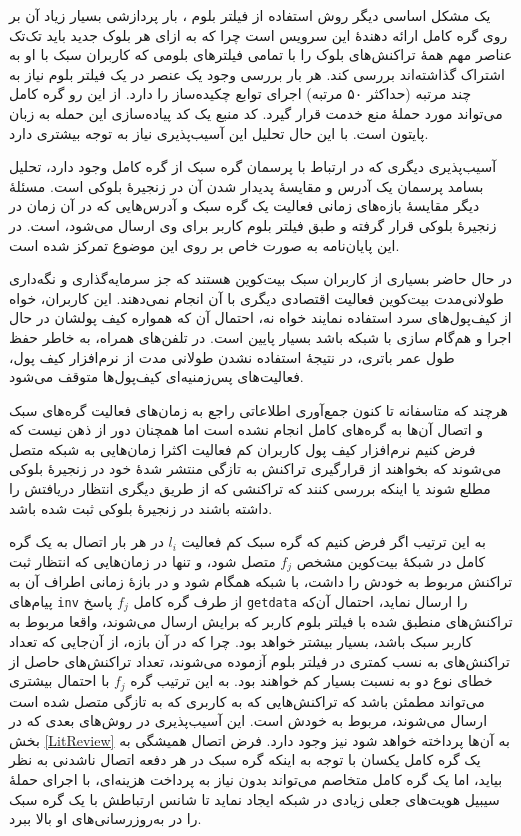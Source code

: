 یک مشکل اساسی دیگر روش استفاده از فیلتر بلوم \cite{Hearn2013}، بار پردازشی بسیار زیاد آن بر روی گره کامل ارائه دهندهٔ این سرویس است چرا که به ازای هر بلوک جدید باید تک‌تک عناصر مهم همهٔ تراکنش‌های بلوک را با تمامی فیلتر‌های بلومی که کاربران سبک با او به اشتراک گذاشته‌اند بررسی کند. هر بار بررسی وجود یک عنصر در یک فیلتر بلوم نیاز به چند مرتبه (حداکثر ۵۰ مرتبه) اجرای توابع چکیده‌ساز را دارد. از این رو گره کامل می‌تواند مورد 
حملهٔ منع خدمت 
قرار گیرد. کد منبع \cite{PeterTodd} یک کد پیاده‌سازی این حمله به زبان پایتون است. با این حال تحلیل این آسیب‌پذیری نیاز به توجه بیشتری دارد.

آسیب‌پذیری دیگری که در ارتباط با پرسمان‌ گره سبک از گره کامل وجود دارد، تحلیل بسامد پرسمان یک آدرس  و مقایسهٔ پدیدار شدن آن در زنجیرهٔ بلوکی است. مسئلهٔ دیگر مقایسهٔ بازه‌های زمانی فعالیت یک گره سبک و آدرس‌هایی که در آن زمان در زنجیرهٔ بلوکی قرار گرفته و طبق فیلتر بلوم کاربر برای وی ارسال می‌شود، است. در این پایان‌نامه به صورت خاص بر روی این موضوع تمرکز شده است. 

در حال حاضر بسیاری از کاربران سبک بیت‌کوین هستند که جز سرمایه‌گذاری و نگه‌داری طولانی‌مدت بیت‌کوین فعالیت اقتصادی دیگری با آن انجام نمی‌دهند. این کاربران، خواه از کیف‌پول‌های سرد استفاده نمایند خواه نه، احتمال آن که همواره کیف پولشان در حال اجرا و هم‌گام سازی با شبکه باشد بسیار پایین است. در تلفن‌های همراه، به خاطر حفظ طول عمر باتری، در نتیجهٔ استفاده نشدن طولانی مدت از نرم‌افزار کیف پول، فعالیت‌‌های پس‌زمنیه‌‌ای کیف‌پول‌ها متوقف می‌شود.  

هرچند که متاسفانه تا کنون جمع‌آوری اطلاعاتی راجع به زمان‌های فعالیت گره‌های سبک و اتصال آن‌ها به گره‌های کامل انجام نشده است اما همچنان دور از ذهن نیست که فرض کنیم نرم‌افزار کیف پول کاربران کم فعالیت اکثرا زمان‌هایی به شبکه متصل می‌شوند که بخواهند از قرارگیری تراکنش به تازگی منتشر شدهٔ خود در زنجیرهٔ بلوکی مطلع شوند یا اینکه بررسی کنند که تراکنشی که از طریق دیگری انتظار دریافتش را داشته باشند در زنجیرهٔ بلوکی ثبت شده باشد. 

به این ترتیب اگر فرض کنیم که گره سبک کم فعالیت $l_i$ در هر بار اتصال به یک گره کامل در شبکهٔ بیت‌کوین مشخص $f_j$ متصل شود، و تنها در زمان‌هایی که انتظار ثبت تراکنش مربوط به خودش را داشت، با شبکه همگام شود و در بازهٔ زمانی اطراف آن به پیام‌های \texttt{inv} از طرف گره کامل $f_j$ پاسخ‌ \texttt{getdata} را ارسال نماید، احتمال آن‌که تراکنش‌های منطبق شده با فیلتر بلوم کاربر که برایش ارسال می‌شوند، واقعا مربوط به کاربر سبک باشد، بسیار بیشتر خواهد بود. چرا که در آن بازه، از آن‌جایی که  تعداد تراکنش‌های به نسب کمتری در فیلتر بلوم آزموده می‌شوند،‌ تعداد تراکنش‌های حاصل از خطای نوع دو به نسبت بسیار کم خواهند بود. به این ترتیب گره $f_j$ با احتمال بیشتری می‌تواند مطمئن باشد که تراکنش‌هایی که به کاربری که به تازگی متصل شده است ارسال می‌شوند، مربوط به خودش است.  این آسیب‌پذیری در روش‌های بعدی که در بخش \ref{LitReview} به آن‌ها پرداخته خواهد شود نیز وجود دارد. فرض اتصال همیشگی به یک گره کامل یکسان با توجه به اینکه گره سبک در هر دفعه اتصال ناشدنی به نظر بیاید، اما یک گره کامل متخاصم می‌تواند بدون نیاز به پرداخت هزینه‌ای، با اجرای 
حملهٔ سیبیل
هویت‌های جعلی زیادی در شبکه ایجاد نماید تا شانس ارتباطش با یک گره سبک را در به‌روزرسانی‌های او بالا ببرد. 

